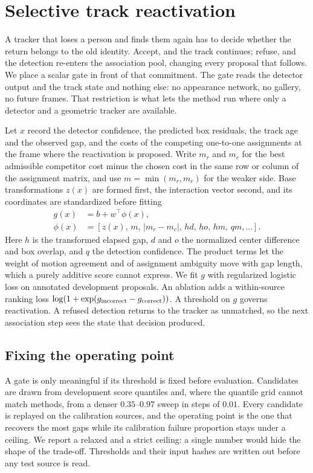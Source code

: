 \section{Selective track reactivation}

A tracker that loses a person and finds them again has to decide whether
the return belongs to the old identity. Accept, and the track continues;
refuse, and the detection re-enters the association pool, changing every
proposal that follows. We place a scalar gate in front of that commitment.
The gate reads the detector output and the track state and nothing else:
no appearance network, no gallery, no future frames. That restriction is
what lets the method run where only a detector and a geometric tracker
are available.

Let $x$ record the detector confidence, the predicted box residuals, the
track age and the observed gap, and the costs of the competing one-to-one
assignments at the frame where the reactivation is proposed. Write $m_r$
and $m_c$ for the best admissible competitor cost minus the chosen cost in
the same row or column of the assignment matrix, and use
$m=\min(m_r,m_c)$ for the weaker side. Base transformations $z(x)$ are
formed first, the interaction vector second, and its coordinates are
standardized before fitting
\begin{align*}
g(x) &= b+w^\top \phi(x),\\
\phi(x) &= [z(x),\,m,\,|m_r-m_c|,\,h d,\,h o,\,h m,\,q m,\ldots].
\end{align*}
Here $h$ is the transformed elapsed gap, $d$ and $o$ the normalized center
difference and box overlap, and $q$ the detection confidence. The product
terms let the weight of motion agreement and of assignment ambiguity move
with gap length, which a purely additive score cannot express.
We fit $g$ with regularized logistic loss on annotated development
proposals. An ablation adds a within-source ranking loss
$\log(1+\exp(g_{\rm incorrect}-g_{\rm correct}))$.
A threshold on $g$ governs reactivation. A refused detection returns to
the tracker as unmatched, so the next association step sees the state that
decision produced.

\subsection{Fixing the operating point}

A gate is only meaningful if its threshold is fixed before evaluation.
Candidates are drawn from development score quantiles and, where the
quantile grid cannot match methods, from a denser $0.35$--$0.97$ sweep in
steps of $0.01$. Every candidate is replayed on the calibration sources,
and the operating point is the one that recovers the most gaps while its
calibration failure proportion stays under a ceiling. We report a relaxed
and a strict ceiling: a single number would hide the shape of the
trade-off. Thresholds and their input hashes are written out before any
test source is read.

